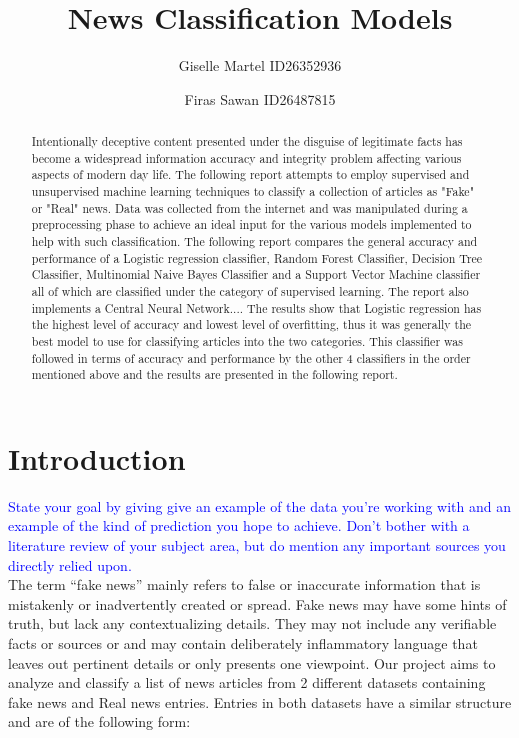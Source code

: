 \documentclass[10pt,twocolumn,letterpaper]{article}
\begin{document}
\title{News Classification Models}
\author{Giselle Martel ID26352936 \and Firas Sawan ID26487815}
\maketitle

\begin{abstract}
   Intentionally deceptive content presented under the disguise of legitimate facts has become a widespread information accuracy and integrity problem affecting various aspects of modern day life. The following report attempts to employ supervised and unsupervised machine learning techniques to classify a collection of articles as "Fake" or "Real" news. Data was collected from the internet and was manipulated during a preprocessing phase to achieve an ideal input for the various models implemented to help with such classification. The following report compares the general accuracy and performance of a Logistic regression classifier, Random Forest Classifier, Decision Tree Classifier, Multinomial Naive Bayes Classifier and a Support Vector Machine classifier all of which are classified under the category of supervised learning. The report also implements a Central Neural Network.... The results show that Logistic regression has the highest level of accuracy and lowest level of overfitting, thus it was generally the best model to use for classifying articles into the two categories. This classifier was followed in terms of accuracy and performance by the other 4 classifiers in the order mentioned above and the results are presented in the following report. 
\end{abstract} 

\section{Introduction}
\textcolor{blue}{State your goal by giving give an example of the data you're working with and an example of the kind of prediction you hope to achieve. Don't bother with a literature review of your subject area, but do mention any important sources you directly relied upon.}\\

The term “fake news” mainly refers to false or inaccurate information that is mistakenly or inadvertently created or spread. Fake news may have some hints of truth, but lack any contextualizing details. They may not include any verifiable facts or sources or and may contain deliberately inflammatory language that leaves out pertinent details or only presents one viewpoint. Our project aims to analyze and classify a list of news articles from 2 different datasets containing fake news and Real news entries. Entries in both datasets have a similar structure and are of the following form:   
\end{document}
